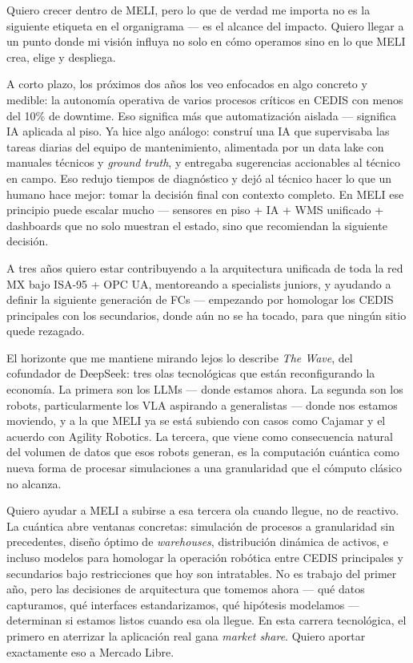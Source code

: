 \documentclass[11pt, letterpaper]{article}
\begin{document}
Quiero crecer dentro de MELI, pero lo que de verdad me importa no es la siguiente etiqueta en el organigrama --- es el alcance del impacto. Quiero llegar a un punto donde mi visión influya no solo en cómo operamos sino en lo que MELI crea, elige y despliega.

A corto plazo, los próximos dos años los veo enfocados en algo concreto y medible: la autonomía operativa de varios procesos críticos en CEDIS con menos del 10\% de downtime. Eso significa más que automatización aislada --- significa IA aplicada al piso. Ya hice algo análogo: construí una IA que supervisaba las tareas diarias del equipo de mantenimiento, alimentada por un data lake con manuales técnicos y \textit{ground truth}, y entregaba sugerencias accionables al técnico en campo. Eso redujo tiempos de diagnóstico y dejó al técnico hacer lo que un humano hace mejor: tomar la decisión final con contexto completo. En MELI ese principio puede escalar mucho --- sensores en piso + IA + WMS unificado + dashboards que no solo muestran el estado, sino que recomiendan la siguiente decisión.

A tres años quiero estar contribuyendo a la arquitectura unificada de toda la red MX bajo ISA-95 + OPC UA, mentoreando a specialists juniors, y ayudando a definir la siguiente generación de FCs --- empezando por homologar los CEDIS principales con los secundarios, donde aún no se ha tocado, para que ningún sitio quede rezagado.

El horizonte que me mantiene mirando lejos lo describe \textit{The Wave}, del cofundador de DeepSeek: tres olas tecnológicas que están reconfigurando la economía. La primera son los LLMs --- donde estamos ahora. La segunda son los robots, particularmente los VLA aspirando a generalistas --- donde nos estamos moviendo, y a la que MELI ya se está subiendo con casos como Cajamar y el acuerdo con Agility Robotics. La tercera, que viene como consecuencia natural del volumen de datos que esos robots generan, es la computación cuántica como nueva forma de procesar simulaciones a una granularidad que el cómputo clásico no alcanza.

Quiero ayudar a MELI a subirse a esa tercera ola cuando llegue, no de reactivo. La cuántica abre ventanas concretas: simulación de procesos a granularidad sin precedentes, diseño óptimo de \textit{warehouses}, distribución dinámica de activos, e incluso modelos para homologar la operación robótica entre CEDIS principales y secundarios bajo restricciones que hoy son intratables. No es trabajo del primer año, pero las decisiones de arquitectura que tomemos ahora --- qué datos capturamos, qué interfaces estandarizamos, qué hipótesis modelamos --- determinan si estamos listos cuando esa ola llegue. En esta carrera tecnológica, el primero en aterrizar la aplicación real gana \textit{market share}. Quiero aportar exactamente eso a Mercado Libre.
\end{document}
